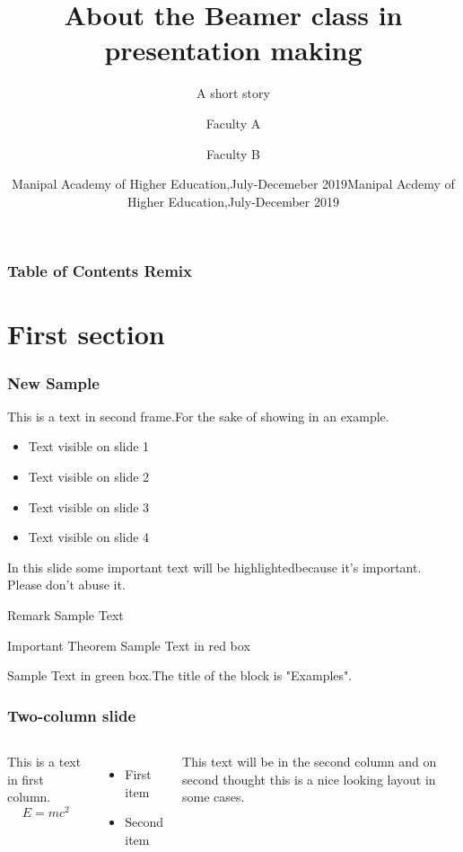 \documentclass[9pt]{beamer}
\title[About Beamer]{About the Beamer class in presentation making}
\subtitle{A short story}
\author[Author 1,Author 2]{Faculty A \inst{1} \and Faculty B \inst{2}}
\institute
{
	\inst{1}
	MIT A,MAHE A,Manipal A
	\and \inst{2}
	MIT B ,MAHE B,Manipal B
}
\date[Dept of CSE 2019]{Manipal Academy of Higher Education,July-Decemeber 2019}
\date{Manipal Acdemy of Higher Education,July-December 2019}
\begin{document}
	\frame{\titlepage}
	\begin{frame}
		\frametitle{Table of Contents Remix}
		\tableofcontents
	\end{frame}
	\section{First section}
	\begin{frame}
		\frametitle{New Sample}
		This is a text in second frame.For the sake of showing in an example.
		\begin{itemize}
			\item <1->Text visible on slide 1
			\item <2->Text visible on slide 2
			\item <3->Text visible on slide 3
			\item <4->Text visible on slide 4			
		\end{itemize}
	\end{frame}

	
	\begin{frame}
		In this slide \pause
		some important text will be
		\alert{highlighted}because it's important.
		Please don't abuse it.
	
		\begin{block}{Remark}
			Sample Text
		\end{block}
	
		\begin{alertblock}{Important Theorem}
			Sample Text in red box
		\end{alertblock}
	
		\begin{examples}
			Sample Text in green box.The title of the block is "Examples".
		\end{examples}	
	\end{frame}

	\begin{frame}
		\frametitle{Two-column slide}
		\begin{columns}
			\column{0.5\textwidth}
			This is a text in first column.
			$$E=mc^2$$
			\begin{itemize}
				\item First item
				\item Second item
			\end{itemize}
		
			\column{0.5\textwidth}
			This text will be in the second column and on second thought this is a nice looking layout in some cases.
		\end{columns}
	\end{frame}

\end{document}
